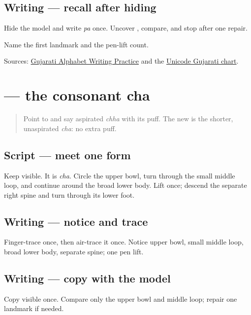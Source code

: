 \subsection*{Writing — recall after hiding}
Hide the model and write \emph{pa} once. Uncover \textbf{}, compare, and stop after one repair.

\begin{tcolorbox}[breakable,colback=teal!4,colframe=teal!35!black,title={Before you move on}]
Name the first landmark and the pen-lift count.

Sources: \href{https://www.t30apps.com/gujarati-alphabet-writing/}{Gujarati Alphabet Writing Practice} and the \href{https://www.unicode.org/charts/PDF/U0A80.pdf}{Unicode Gujarati chart}.
\end{tcolorbox}
\section[\texorpdfstring{\gu{ચ} (cha)}{ચ (cha)}]{ — the consonant cha}

\label{lesson:GU-W05-cha}



\begin{quote}
Point to \textbf{} and say aspirated \emph{chha} with its puff. The new \textbf{} is the shorter, unaspirated \emph{cha}: no extra puff.
\end{quote}

\subsection*{Script — meet one form}
Keep \textbf{} visible. It is \emph{cha}. Circle the upper bowl, turn through the small middle loop, and continue around the broad lower body. Lift once; descend the separate right spine and turn through its lower foot.

\subsection*{Writing — notice and trace}

Finger-trace \textbf{} once, then air-trace it once. Notice upper bowl, small middle loop, broad lower body, separate spine; one pen lift.

\subsection*{Writing — copy with the model}
Copy visible \textbf{} once. Compare only the upper bowl and middle loop; repair one landmark if needed.

